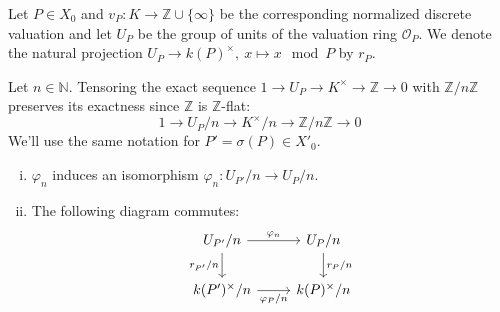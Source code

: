 Let $P\in X_0$ and $v_P:K\to\mathbb{Z}\cup\{\infty\}$ be the corresponding normalized discrete valuation and let $U_P$ be the group of units of the valuation ring $\mathcal{O}_P$. We denote the natural projection $U_P\to k(P)^\times,\ x\mapsto x\mod P$ by $r_P$. 

Let $n\in\mathbb{N}$. Tensoring the exact sequence $1\to U_P\to K^\times \to\mathbb{Z}\to 0$ with $\mathbb{Z}/n\mathbb{Z}$ preserves its exactness since $\mathbb{Z}$ is $\mathbb{Z}$-flat:
\[ 1\longrightarrow U_P/n\longrightarrow K^\times/n\longrightarrow\mathbb{Z}/n\mathbb{Z}\longrightarrow 0 \]
We'll use the same notation for $P' = \sigma(P)\in X'_0$.

\begin{lemma}\label{4.3}
\begin{enumerate}[(i)]
\item $\varphi_n$ induces an isomorphism $\varphi_n: U_{P'}/n\to U_P/n$.
\item The following diagram commutes:
\[ \begin{tikzcd}
U_{P'}/n \rar["\varphi_n"] \dar["r_{P'}/n"'] & U_P/n \dar["r_P/n"]\\
k(P')^\times/n \rar["\varphi_P/n"'] & k(P)^\times/n
\end{tikzcd} \]
\end{enumerate}
\end{lemma}


